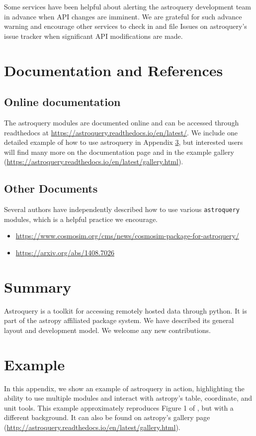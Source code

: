 \documentclass[twocolumn]{aastex61}
\begin{document}
Some services have been helpful about alerting the astroquery development team
in advance when API changes are imminent.  We are grateful for such advance
warning and encourage other services to check in and file Issues on astroquery's
issue tracker when significant API modifications are made.

\section{Documentation and References}
\subsection{Online documentation}
The astroquery modules are documented online and can be accessed through
readthedocs at \url{https://astroquery.readthedocs.io/en/latest/}.
We include one detailed example of how to use astroquery in Appendix \ref{sec:example},
but interested users will find many more on the documentation page and 
in the example gallery (\url{https://astroquery.readthedocs.io/en/latest/gallery.html}).

\subsection{Other Documents}
Several authors have independently described how to use various \texttt{astroquery}
modules, which is a helpful practice we encourage.

\begin{itemize}
    \item \url{https://www.cosmosim.org/cms/news/cosmosim-package-for-astroquery/}
    \item \url{https://arxiv.org/abs/1408.7026}
\end{itemize}

\section{Summary}
Astroquery is a toolkit for accessing remotely hosted data through python.
It is part of the astropy affiliated package system.  
We have described its general layout and development model.
We welcome any new contributions.





\appendix
\section{Example}
\label{sec:example}
In this appendix, we show an example of astroquery in action, highlighting the
ability to use multiple modules and interact with astropy's table, coordinate,
and unit tools.  This example approximately reproduces Figure 1 of
\citet{Eisner2016a}, but with a different background.
It can also be found on astropy's gallery page (\url{http://astroquery.readthedocs.io/en/latest/gallery.html}).
\end{document}
